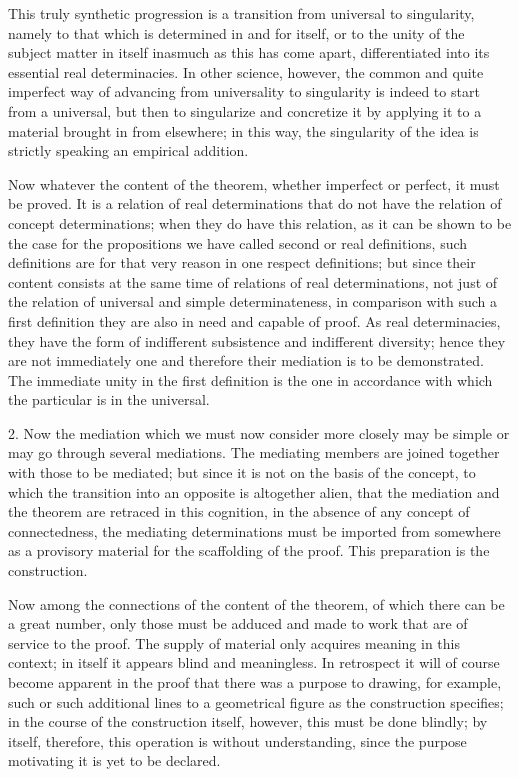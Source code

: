 This truly synthetic progression is a transition
from universal to singularity,
namely to that which is determined in and for itself,
or to the unity of the subject matter in itself
inasmuch as this has come apart,
differentiated into its essential real determinacies.
In other science, however,
the common and quite imperfect way of
advancing from universality to singularity is
indeed to start from a universal,
but then to singularize and concretize it
by applying it to a material brought in from elsewhere;
in this way, the singularity of the idea is
strictly speaking an empirical addition.

Now whatever the content of the theorem,
whether imperfect or perfect,
it must be proved.
It is a relation of real determinations
that do not have the relation of concept determinations;
when they do have this relation,
as it can be shown to be the case for the propositions
we have called second or real definitions,
such definitions are for that very reason
in one respect definitions;
but since their content consists at the same time
of relations of real determinations,
not just of the relation of
universal and simple determinateness,
in comparison with such a first definition they
are also in need and capable of proof.
As real determinacies, they have the form of
indifferent subsistence and indifferent diversity;
hence they are not immediately one
and therefore their mediation is to be demonstrated.
The immediate unity in the first definition is
the one in accordance with which
the particular is in the universal.

2. Now the mediation which we must now consider more closely
may be simple or may go through several mediations.
The mediating members are joined together
with those to be mediated;
but since it is not on the basis of the concept,
to which the transition into an opposite is altogether alien,
that the mediation and the theorem are retraced in this cognition,
in the absence of any concept of connectedness,
the mediating determinations must be imported
from somewhere as a provisory material
for the scaffolding of the proof.
This preparation is the construction.

Now among the connections of the content of the theorem,
of which there can be a great number,
only those must be adduced and made to work
that are of service to the proof.
The supply of material only acquires meaning in this context;
in itself it appears blind and meaningless.
In retrospect it will of course become apparent
in the proof that there was a purpose
to drawing, for example, such or such
additional lines to a geometrical figure
as the construction specifies;
in the course of the construction itself, however,
this must be done blindly;
by itself, therefore, this operation is without understanding,
since the purpose motivating it is yet to be declared.

